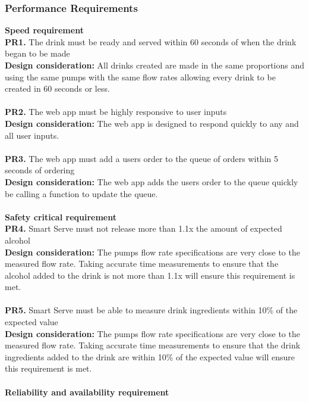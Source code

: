 \documentclass[12pt, titlepage]{article}
\begin{document}
\subsubsection{Performance Requirements}
    \textbf{Speed requirement}\\
        \noindent\textbf{PR1.} The drink must be ready and served within 60 seconds of when the drink began to be made \\
        \indent\textbf{Design consideration:} All drinks created are made in the same proportions and using the same pumps with the same flow rates allowing every drink to be created in 60 seconds or less.\\\\
        \textbf{PR2.} The web app must be highly responsive to user inputs \\
        \indent\textbf{Design consideration:} The web app is designed to respond quickly to any and all user inputs.\\\\
        \textbf{PR3.} The web app must add a users order to the queue of orders within 5 seconds of ordering \\
        \indent\textbf{Design consideration:} The web app adds the users order to the queue quickly be calling a function to update the queue.\\\\
    \textbf{Safety critical requirement}\\
        \noindent\textbf{PR4.} Smart Serve must not release more than 1.1x the amount of expected alcohol \\
        \indent\textbf{Design consideration:} The pumps flow rate specifications are very close to the measured flow rate. Taking accurate time measurements to ensure that the alcohol added to the drink is not more than 1.1x will ensure this requirement is met.\\\\
        \noindent\textbf{PR5.} Smart Serve must be able to measure drink ingredients within 10\% of the expected value \\
        \indent\textbf{Design consideration:} The pumps flow rate specifications are very close to the measured flow rate. Taking accurate time measurements to ensure that the drink ingredients added to the drink are within 10\% of the expected value will ensure this requirement is met.\\\\
    \textbf{Reliability and availability requirement}\\
\end{document}
